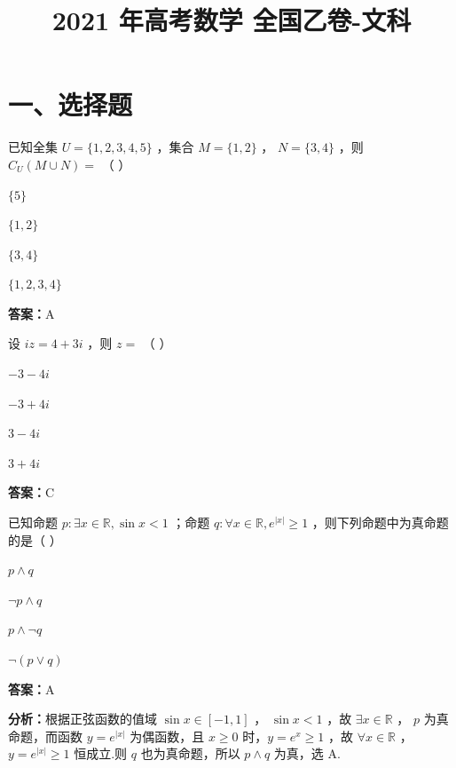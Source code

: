 ﻿\title{2021 年高考数学 全国乙卷-文科}
\date{}
\maketitle

\section*{一、选择题}

\begin{question}[points=5]
已知全集 $U = \{1,2,3,4,5\}$ ，集合 $M = \{1,2\}$ ， $N = \{3,4\}$ ，则 $C_U(M \cup N) =$ （ ）
\begin{choices}
  \item $\{5\}$
  \item $\{1,2\}$
  \item $\{3,4\}$
  \item $\{1,2,3,4\}$
\end{choices}
\begin{solution}
\textbf{答案：}A
\end{solution}
\end{question}

\begin{question}[points=5]
设 $iz = 4 + 3i$ ，则 $z =$ （ ）
\begin{choices}
  \item $-3-4i$
  \item $-3+4i$
  \item $3-4i$
  \item $3+4i$
\end{choices}
\begin{solution}
\textbf{答案：}C
\end{solution}
\end{question}

\begin{question}[points=5]
已知命题 $p: \exists x \in \mathbb{R}, \sin x < 1$ ；命题 $q: \forall x \in \mathbb{R}, e^{|x|} \ge 1$ ，则下列命题中为真命题的是（ ）
\begin{choices}
  \item $p \land q$
  \item $\neg p \land q$
  \item $p \land \neg q$
  \item $\neg(p \lor q)$
\end{choices}
\begin{solution}
\textbf{答案：}A

\textbf{分析：}根据正弦函数的值域 $\sin x \in [-1,1]$ ， $\sin x < 1$ ，故 $\exists x \in \mathbb{R}$ ， $p$ 为真命题，而函数 $y = e^{|x|}$ 为偶函数，且 $x \ge 0$ 时，$y = e^x \ge 1$ ，故 $\forall x \in \mathbb{R}$ ， $y = e^{|x|} \ge 1$ 恒成立.则 $q$ 也为真命题，所以 $p \land q$ 为真，选 A.
\end{solution}
\end{question}

